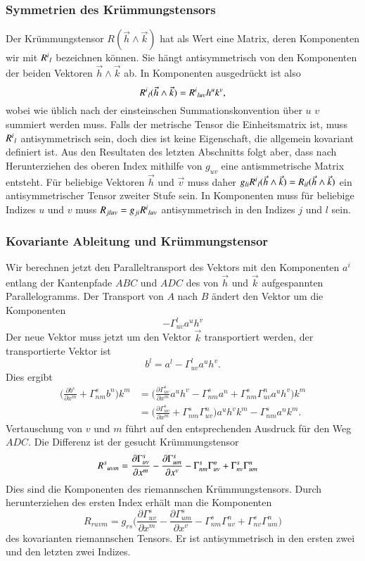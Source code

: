 \subsubsection{Symmetrien des Krümmungstensors}
Der Krümmungstensor $R(\vec{h}\wedge\vec{k})$ hat als Wert eine Matrix,
deren Komponenten wir mit $R^i\mathstrut_l$ bezeichnen können.
Sie hängt antisymmetrisch von den Komponenten der beiden Vektoren
$\vec{h}\wedge\vec{k}$ ab.
In Komponenten ausgedrückt ist also
\[
R^i\mathstrut_l(\vec{h}\wedge\vec{k})
=
R^i\mathstrut_{luv} h^uk^v,
\]
wobei wie üblich nach der einsteinschen Summationskonvention über $u$
$v$ summiert werden muss.
Falls der metrische Tensor die Einheitsmatrix ist, muss $R^i\mathstrut_l$
antisymmetrisch sein, doch dies ist keine Eigenschaft, die allgemein
kovariant definiert ist.
Aus den Resultaten des letzten Abschnitts folgt aber, dass nach
Herunterziehen des oberen Index mithilfe von $g_{uv}$ eine
antismmetrische Matrix entsteht.
Für beliebige Vektoren $\vec{h}$ und $\vec{v}$ muss daher
$g_{li}R^i\mathstrut_l(\vec{h}\wedge\vec{k})=R_{il}(\vec{h}\wedge\vec{k})$
ein antisymmetrischer Tensor zweiter Stufe sein.
In Komponenten muss für beliebige Indizes $u$ und $v$ muss
$R_{jluv}=g_{ji}R^i\mathstrut_{luv}$ antisymmetrisch in den
Indizes $j$ und $l$ sein.

\subsubsection{Kovariante Ableitung und Krümmungstensor}
Wir berechnen jetzt den Paralleltransport des Vektors mit den
Komponenten $a^i$ entlang der Kantenpfade $ABC$ und $ADC$ 
des von $\vec{h}$ und $\vec{k}$ aufgespannten Parallelogramms.
Der Transport von $A$ nach $B$ ändert den Vektor um die Komponenten
\[
-\Gamma^l_{uv} a^u h^v 
\]
Der neue Vektor muss jetzt um den Vektor $\vec{k}$ transportiert
werden, der transportierte Vektor ist
\[
b^l
=
a^l-\Gamma^l_{uv} a^u h^v.
\]
Dies ergibt
\begin{align*}
\biggl(
\frac{\partial b^s}{\partial x^m}
+
\Gamma^s_{nm} b^n
\biggr)
k^m
&=
\biggl(
\frac{\partial \Gamma^s_{uv}}{\partial x^m}
a^u
h^v
-
\Gamma^s_{nm}
a^n
+
\Gamma^s_{nm} \Gamma^n_{uv}
a^u
h^v
\biggr)
k^m
\\
&=
\biggl(
\frac{\partial \Gamma^s_{uv}}{\partial x^m}
+
\Gamma^s_{nm}\Gamma^n_{uv}
\biggr)
a^u
h^v k^m
-
\Gamma^s_{nm}a^nk^m.
\end{align*}
Vertauschung von $v$ und $m$ führt auf den entsprechenden
Ausdruck für den Weg $ADC$.
Die Differenz ist der gesucht Krümmungstensor
\begin{align*}
R^s\mathstrut_{uvm}
&=
\frac{\partial\Gamma^s_{uv}}{\partial x^m}
-
\frac{\partial\Gamma^s_{um}}{\partial x^v}
-
\Gamma^s_{nm}\Gamma^n_{uv}
+
\Gamma^s_{nv}\Gamma^n_{um}
\end{align*}
Dies sind die Komponenten des riemannschen Krümmungstensors.
Durch herunterziehen des ersten Index erhält man die Komponenten
\[
R_{ruvm}
=
g_{rs}
\biggl(
\frac{\partial\Gamma^s_{uv}}{\partial x^m}
-
\frac{\partial\Gamma^s_{um}}{\partial x^v}
-
\Gamma^s_{nm}\Gamma^n_{uv}
+
\Gamma^s_{nv}\Gamma^n_{um}
\biggr)
\]
des kovarianten riemannschen Tensors.
Er ist antisymmetrisch in den ersten zwei und den letzten zwei
Indizes.

